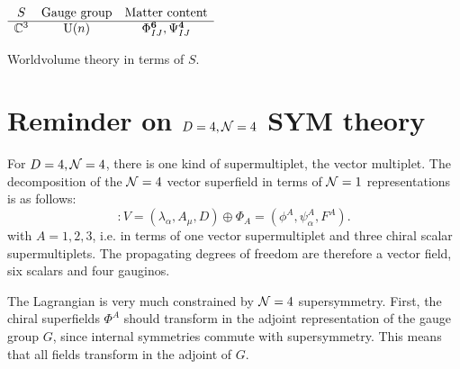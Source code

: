 \documentclass[a4paper,11pt]{article}
\begin{document}
    \vspace{5cm}

    \begin{table}[H]
        \centering
        $
        \begin{array}{ccc}
            S & \text{Gauge group} & \text{Matter content} \\ \hline
            \mathbb{C}^3 & \text{U}(n) & \Phi^{\boldsymbol{6}}_{IJ},\Psi^{\boldsymbol{4}}_{IJ}
        \end{array}
        $
        \caption{Worldvolume theory in terms of $S$.}
    \end{table}


\pagebreak
\appendix

\section{Reminder on $D=4,\mathcal{N}=4$ SYM theory}\label{sec:N4SCFT}
        
    For $D=4,\mathcal{N}=4$, there is one kind of supermultiplet, the vector multiplet. The decomposition of the $\mathcal{N} = 4$ vector superfield in terms of $\mathcal{N} = 1$ representations is as follows:
    \begin{equation}
        [\mN = 4 \text{ vector multiplet}] : V = (\lambda_\alpha, A_\mu, D) \oplus \Phi_A = (\phi^A,\psi^A_\alpha,F^A).
    \end{equation}
    with $A=1,2,3$, i.e. in terms of one vector supermultiplet and three chiral scalar supermultiplets. The propagating degrees of freedom are therefore a vector field, six scalars and four gauginos.
    
    The Lagrangian is very much constrained by $\mathcal{N} = 4$ supersymmetry. First, the chiral superfields $\Phi^A$ should transform in the adjoint representation of the gauge group $G$, since internal symmetries commute with supersymmetry. This means that all fields transform in the adjoint of $G$.
    
\end{document}
